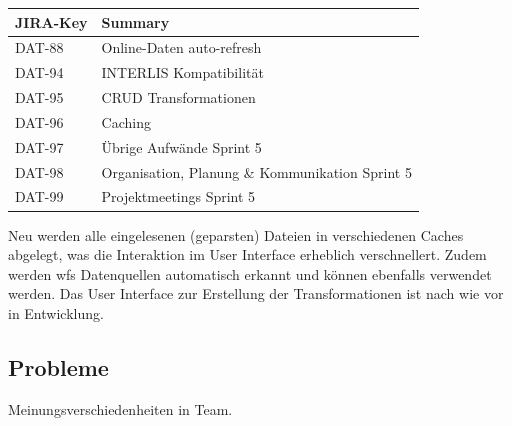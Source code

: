 \begin{table}[H]	
\centering
\begin{tabular}{ll}
	\toprule
	\textbf{JIRA-Key} & \textbf{Summary}\\
	\midrule
DAT-88 & Online-Daten auto-refresh\\
DAT-94 & INTERLIS Kompatibilität\\
DAT-95 & CRUD Transformationen\\
DAT-96 & Caching\\
DAT-97 & Übrige Aufwände Sprint 5\\
DAT-98 & Organisation, Planung \& Kommunikation Sprint 5\\
DAT-99 & Projektmeetings Sprint 5\\
	\bottomrule
\end{tabular}	
\end{table}

Neu werden alle eingelesenen (geparsten) Dateien in verschiedenen Caches abgelegt, was die Interaktion im User Interface erheblich verschnellert. Zudem werden \acs{wfs} Datenquellen automatisch erkannt und können ebenfalls verwendet werden. Das User Interface zur Erstellung der Transformationen ist nach wie vor in Entwicklung.

\subsection*{Probleme}
Meinungsverschiedenheiten in Team.
